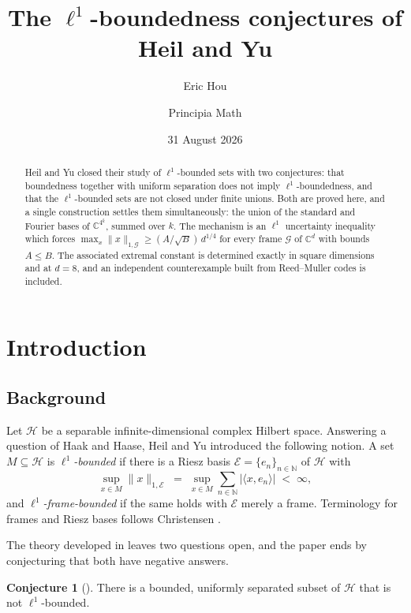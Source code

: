 \documentclass[11pt,reqno]{amsart}
\title[The $\ell^1$-boundedness conjectures of Heil and Yu]
{The $\ell^1$-boundedness conjectures of Heil and Yu}
\author{Eric Hou}
\author{Principia Math}
\date{31 August 2026}
\theoremstyle{plain}
\theoremstyle{definition}
\newtheorem{conjecture}[theorem]{Conjecture}
\theoremstyle{remark}
\newcommand{\C}{\mathbb{C}}
\newcommand{\N}{\mathbb{N}}
\newcommand{\HH}{\mathcal{H}}
\begin{document}
\begin{abstract}
Heil and Yu closed their study of $\ell^1$-bounded sets with two
conjectures: that boundedness together with uniform separation does not
imply $\ell^1$-boundedness, and that the $\ell^1$-bounded sets are not
closed under finite unions.  Both are proved here, and a single
construction settles them simultaneously: the union of the standard and
Fourier bases of $\C^{4^k}$, summed over $k$.  The mechanism is an
$\ell^1$ uncertainty inequality which forces
$\max_{x}\|x\|_{1,\mathcal{G}}\ge(A/\sqrt B)\,d^{1/4}$ for every frame
$\mathcal{G}$ of $\C^d$ with bounds $A\le B$.  The associated extremal
constant is determined exactly in square dimensions and at $d=8$, and an
independent counterexample built from Reed--Muller codes is included.
\end{abstract}

\maketitle

\section{Introduction}

\subsection{Background}

Let $\HH$ be a separable infinite-dimensional complex Hilbert space.
Answering a question of Haak and Haase, Heil and Yu \cite{HeilYu}
introduced the following notion.  A set $M\subseteq\HH$ is
\emph{$\ell^1$-bounded} if there is a Riesz basis
$\mathcal{E}=\{e_n\}_{n\in\N}$ of $\HH$ with
\[
  \sup_{x\in M}\|x\|_{1,\mathcal{E}}
  \;=\;\sup_{x\in M}\sum_{n\in\N}\bigl|\langle x,e_n\rangle\bigr|
  \;<\;\infty,
\]
and \emph{$\ell^1$-frame-bounded} if the same holds with $\mathcal{E}$
merely a frame.  Terminology for frames and Riesz bases follows
Christensen \cite{Christensen}.

The theory developed in \cite{HeilYu} leaves two questions open, and the
paper ends by conjecturing that both have negative answers.

\begin{conjecture}[{\cite[Conj.~4.10]{HeilYu}}]\label{conj:410}
There is a bounded, uniformly separated subset of $\HH$ that is not
$\ell^1$-bounded.
\end{conjecture}
\end{document}
